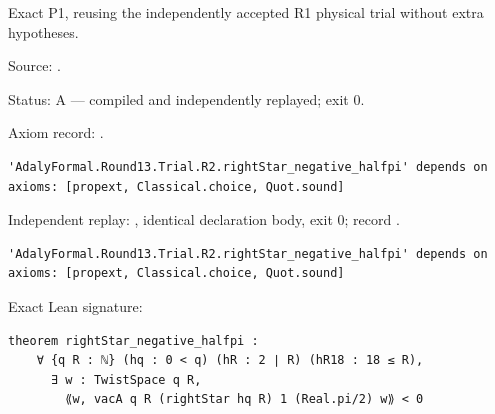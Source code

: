 \begin{theorem}[bp-435]
\label{bp-435}
\leanok
Exact P1, reusing the independently accepted R1 physical trial without extra hypotheses.

\par Source: \texttt{}.
\par Status: A — compiled and independently replayed; exit 0.
\par Axiom record: \texttt{}.
\begin{verbatim}
'AdalyFormal.Round13.Trial.R2.rightStar_negative_halfpi' depends on axioms: [propext, Classical.choice, Quot.sound]
\end{verbatim}
\par Independent replay: \texttt{}, identical declaration body, exit 0; record \texttt{}.
\begin{verbatim}
'AdalyFormal.Round13.Trial.R2.rightStar_negative_halfpi' depends on axioms: [propext, Classical.choice, Quot.sound]
\end{verbatim}
\par Exact Lean signature:
\begin{verbatim}
theorem rightStar_negative_halfpi :
    ∀ {q R : ℕ} (hq : 0 < q) (hR : 2 ∣ R) (hR18 : 18 ≤ R),
      ∃ w : TwistSpace q R,
        ⟪w, vacA q R (rightStar hq R) 1 (Real.pi/2) w⟫ < 0
\end{verbatim}
\end{theorem}

